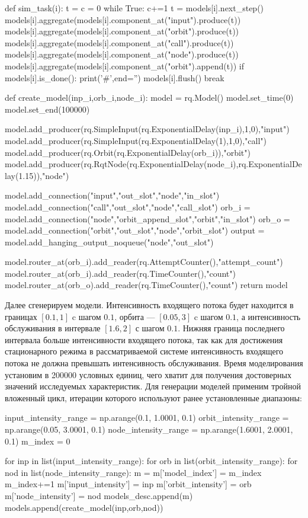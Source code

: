\begin{pyin} 
def sim_task(i):
   t = c = 0
   while True:
      c+=1 
      t = models[i].next_step()
      models[i].aggregate(models[i].component_at("input").produce(t))
      models[i].aggregate(models[i].component_at("orbit").produce(t))
      models[i].aggregate(models[i].component_at("call").produce(t))
      models[i].aggregate(models[i].component_at("node").produce(t))
      models[i].aggregate(models[i].component_at("orbit").append(t))
      if models[i].is_done():
         print('#',end='')
         models[i].flush()
         break
\end{pyin}         

\begin{pyin}
def create_model(inp_i,orb_i,node_i):
model = rq.Model()
model.set_time(0) 
model.set_end(100000)

model.add_producer(rq.SimpleInput(rq.ExponentialDelay(inp_i),1,0),"input")
model.add_producer(rq.SimpleInput(rq.ExponentialDelay(1),1,0),"call")
model.add_producer(rq.Orbit(rq.ExponentialDelay(orb_i)),"orbit")
model.add_producer(rq.RqtNode(rq.ExponentialDelay(node_i),rq.ExponentialDelay(1.15)),"node")

model.add_connection("input","out_slot","node","in_slot")
model.add_connection("call","out_slot","node","call_slot")
orb_i = model.add_connection("node","orbit_append_slot","orbit","in_slot")
orb_o = model.add_connection("orbit","out_slot","node","orbit_slot")
output = model.add_hanging_output_noqueue("node","out_slot")

model.router_at(orb_i).add_reader(rq.AttemptCounter(),"attempt_count")
model.router_at(orb_i).add_reader(rq.TimeCounter(),"count")
model.router_at(orb_o).add_reader(rq.TimeCounter(),"count")
return model
\end{pyin}


Далее сгенерируем модели. Интенсивность входящего потока будет находится в границах $[0.1,1]$ c шагом $0.1$, орбита --- $[0.05,3]$ c шагом $0.1$, а интенсивность обслуживания в интервале $[1.6,2]$ с шагом $0.1$. Нижняя граница последнего интервала больше интенсивности входящего потока, так как для достижения стационарного режима в рассматриваемой системе интенсивность входящего потока не должна превышать интенсивность обслуживания. Время моделирования установим в 200000 условных единиц, чего хватит для получения достоверных значений исследуемых характеристик. Для генерации моделей применим тройной вложенный цикл, итерации которого используют ранее установленные диапазоны:
\begin{pyin} 
input_intensity_range = np.arange(0.1, 1.0001, 0.1)
orbit_intensity_range = np.arange(0.05, 3.0001, 0.1)
node_intensity_range = np.arange(1.6001, 2.0001, 0.1)
m_index = 0

for inp in list(input_intensity_range):
   for orb in list(orbit_intensity_range):
      for nod in list(node_intensity_range):
         m = {}
         m['model_index'] = m_index
         m_index+=1
         m['input_intensity'] = inp
         m['orbit_intensity'] = orb
         m['node_intensity'] = nod
         models_desc.append(m)
         models.append(create_model(inp,orb,nod))
\end{pyin}

